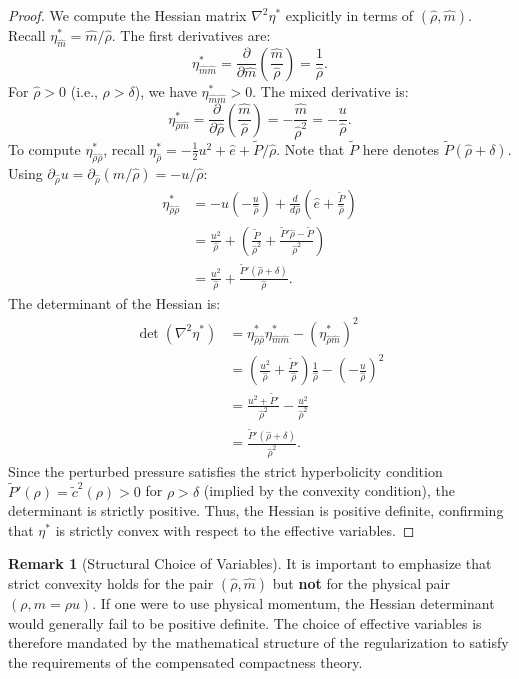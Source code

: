 \documentclass[12pt, reqno]{article}
\theoremstyle{definition}
\newtheorem{remark}[theorem]{Remark}
\newcommand{\pa}{\partial}
\numberwithin{equation}{section}
\begin{document}
\begin{proof}
We compute the Hessian matrix $\nabla^2 \eta^*$ explicitly in terms of $(\hat{\rho}, \hat{m})$.
Recall $\eta^*_{\hat{m}} = \hat{m}/\hat{\rho}$. The first derivatives are:
\[
    \eta^*_{\hat{m}\hat{m}} = \frac{\pa}{\pa \hat{m}}\left(\frac{\hat{m}}{\hat{\rho}}\right) = \frac{1}{\hat{\rho}}.
\]
For $\hat{\rho} > 0$ (i.e., $\rho > \delta$), we have $\eta^*_{\hat{m}\hat{m}} > 0$.
The mixed derivative is:
\[
    \eta^*_{\hat{\rho}\hat{m}} = \frac{\pa}{\pa \hat{\rho}}\left(\frac{\hat{m}}{\hat{\rho}}\right) = -\frac{\hat{m}}{\hat{\rho}^2} = -\frac{u}{\hat{\rho}}.
\]
To compute $\eta^*_{\hat{\rho}\hat{\rho}}$, recall $\eta^*_{\hat{\rho}} = -\frac{1}{2}u^2 + \hat{e} + \tilde{P}/\hat{\rho}$. Note that $\tilde{P}$ here denotes $\tilde{P}(\hat{\rho}+\delta)$.
Using $\pa_{\hat{\rho}} u = \pa_{\hat{\rho}}(\hat{m}/\hat{\rho}) = -u/\hat{\rho}$:
\begin{align*}
    \eta^*_{\hat{\rho}\hat{\rho}} &= -u \left(-\frac{u}{\hat{\rho}}\right) + \frac{d}{d\hat{\rho}}\left( \hat{e} + \frac{\tilde{P}}{\hat{\rho}} \right) \\
    &= \frac{u^2}{\hat{\rho}} + \left( \frac{\tilde{P}}{\hat{\rho}^2} + \frac{\tilde{P}'\hat{\rho} - \tilde{P}}{\hat{\rho}^2} \right) \\
    &= \frac{u^2}{\hat{\rho}} + \frac{\tilde{P}'(\hat{\rho}+\delta)}{\hat{\rho}}.
\end{align*}
The determinant of the Hessian is:
\begin{align*}
    \det(\nabla^2 \eta^*) &= \eta^*_{\hat{\rho}\hat{\rho}} \eta^*_{\hat{m}\hat{m}} - (\eta^*_{\hat{\rho}\hat{m}})^2 \\
    &= \left( \frac{u^2}{\hat{\rho}} + \frac{\tilde{P}'}{\hat{\rho}} \right) \frac{1}{\hat{\rho}} - \left( -\frac{u}{\hat{\rho}} \right)^2 \\
    &= \frac{u^2 + \tilde{P}'}{\hat{\rho}^2} - \frac{u^2}{\hat{\rho}^2} \\
    &= \frac{\tilde{P}'(\hat{\rho}+\delta)}{\hat{\rho}^2}.
\end{align*}
Since the perturbed pressure satisfies the strict hyperbolicity condition $\tilde{P}'(\rho) = \tilde{c}^2(\rho) > 0$ for $\rho > \delta$ (implied by the convexity condition), the determinant is strictly positive.
Thus, the Hessian is positive definite, confirming that $\eta^*$ is strictly convex with respect to the effective variables.
\end{proof}

\begin{remark}[Structural Choice of Variables]
It is important to emphasize that strict convexity holds for the pair $(\hat{\rho}, \hat{m})$ but \textbf{not} for the physical pair $(\rho, m=\rho u)$. If one were to use physical momentum, the Hessian determinant would generally fail to be positive definite. The choice of effective variables is therefore mandated by the mathematical structure of the regularization to satisfy the requirements of the compensated compactness theory.
\end{remark}
\end{document}
